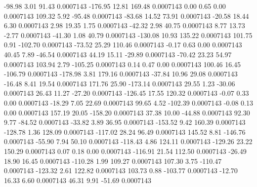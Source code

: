       -98.98        3.01       91.43     0.0007143
     -176.95       12.81      169.48     0.0007143
        0.00        0.65        0.00     0.0007143
      109.32        5.92      -95.48     0.0007143
      -83.68       14.52       73.91     0.0007143
      -20.58       18.44        6.30     0.0007143
        2.98       19.35        1.75     0.0007143
      -42.32        2.98       40.75     0.0007143
        8.77       13.73       -2.77     0.0007143
      -41.30        1.08       40.79     0.0007143
     -130.08       10.93      135.22     0.0007143
      101.75        0.91     -102.70     0.0007143
      -73.52       25.29      110.46     0.0007143
       -0.17        0.63        0.00     0.0007143
       40.45        7.89      -46.54     0.0007143
       44.19       15.11      -29.89     0.0007143
      -70.42       23.23       54.97     0.0007143
      103.94        2.79     -105.25     0.0007143
        0.14        0.47        0.00     0.0007143
      100.46       16.45     -106.79     0.0007143
     -178.98        3.81      179.16     0.0007143
      -37.84       10.96       29.08     0.0007143
      -16.48        8.41       19.54     0.0007143
      171.76       25.90     -173.14     0.0007143
       29.55        1.23      -30.06     0.0007143
       26.43       11.27      -27.20     0.0007143
     -126.45       17.55      120.32     0.0007143
       -0.07        0.33        0.00     0.0007143
      -18.29        7.05       22.69     0.0007143
       99.65        4.52     -102.39     0.0007143
       -0.08        0.13        0.00     0.0007143
      157.19       20.05     -158.20     0.0007143
       37.38       10.00      -44.88     0.0007143
       92.30        9.77      -84.52     0.0007143
      -33.82        3.89       36.95     0.0007143
     -153.52        9.42      160.39     0.0007143
     -128.78        1.36      128.09     0.0007143
     -117.02       28.24       96.49     0.0007143
      145.52        8.81     -146.76     0.0007143
      -55.90        7.94       50.10     0.0007143
     -118.43        4.86      124.11     0.0007143
     -129.26       23.22      150.29     0.0007143
        0.07        0.18        0.00     0.0007143
     -116.91       21.54      112.50     0.0007143
      -26.49       18.90       16.45     0.0007143
     -110.28        1.99      109.27     0.0007143
      107.30        3.75     -110.47     0.0007143
     -123.32        2.61      122.82     0.0007143
      103.73        0.88     -103.77     0.0007143
      -12.70       16.33        6.60     0.0007143
       46.31        9.91      -51.69     0.0007143
